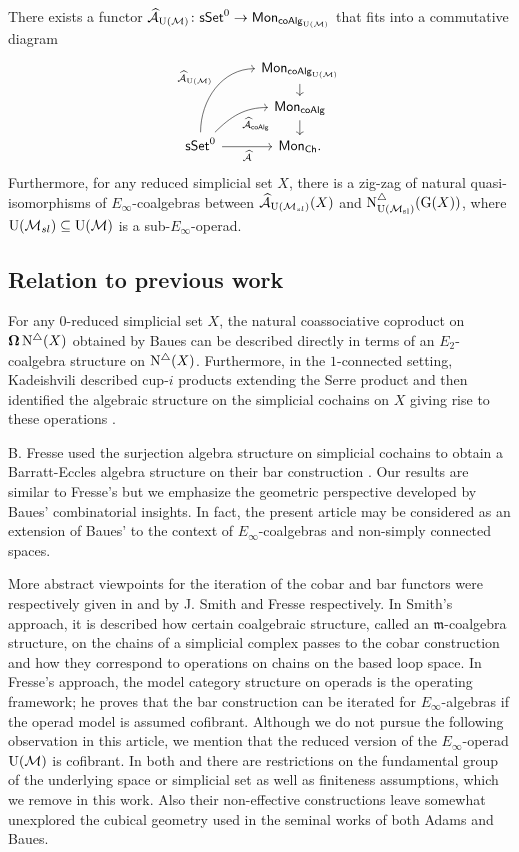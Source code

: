 \begin{theorem} \label{t:2nd main thm in the intro} There exists a functor $\operatorname{\mathcal{\widehat{A}}}_{\operatorname{U}(\mathcal{M})} \colon \mathsf{sSet}^0 \to \mathsf{Mon}_{\mathsf{coAlg}_{\operatorname{U}(\mathcal{M})}}$ that fits into a commutative diagram
	\[
	\begin{tikzcd}[row sep=small]
	& \Mon_{\coAlg_\UM} \arrow[d] \\
	& \Mon_{\coAlg} \arrow[d] \\
	\sSet^0
	\arrow[r, "\Ahat"', ]
	\arrow[ru, "\Ahat_{\coAlg}"', out=45, in=180] 
	\arrow[ruu, "\Ahat_\UM", out=90, in=180]
	& \Mon_{\Ch}.
	\end{tikzcd}
	\]
	Furthermore, for any reduced simplicial set $X$, there is a zig-zag of natural quasi-isomorphisms of $E_{\infty}$-coalgebras between $\operatorname{\mathcal{\widehat{A}}}_{\operatorname{U}(\mathcal{M}_{sl})}(X)$ and $\operatorname{N^{\triangle}_{{\operatorname{U}(\mathcal{M}_{sl})}}}(\operatorname{G}(X))$, where ${\operatorname{U}(\mathcal{M}_{sl})} \subseteq {\operatorname{U}(\mathcal{M})}$ is a sub-$E_\infty$-operad.
\end{theorem}

\subsection*{Relation to previous work}

For any $0$-reduced simplicial set $X$, the natural coassociative coproduct on $\operatorname{\mathbf{\Omega}} \operatorname{N^{\triangle}}(X)$ obtained by Baues can be described directly in terms of an $E_2$-coalgebra structure on $\operatorname{N^{\triangle}}(X)$.
Furthermore, in the $1$-connected setting, Kadeishvili described cup-$i$ products extending the Serre product and then identified the algebraic structure on the simplicial cochains on $X$ giving rise to these operations \cite{kadeishvili1999coproducts, kadeishvili2003cup-i}.

B. Fresse used the surjection algebra structure on simplicial cochains to obtain a Barratt-Eccles algebra structure on their bar construction \cite{fresse2003hopf}.
Our results are similar to Fresse's but we emphasize the geometric perspective developed by Baues' combinatorial insights.
In fact, the present article may be considered as an extension of Baues' \cite{baues1998hopf} to the context of $E_{\infty}$-coalgebras and non-simply connected spaces.

More abstract viewpoints for the iteration of the cobar and bar functors were respectively given in \cite{smith1994cobar} and \cite{fresse2010props} by J. Smith and Fresse respectively.
In Smith's approach, it is described how certain coalgebraic structure, called an $\mathfrak{m}$-coalgebra structure, on the chains of a simplicial complex passes to the cobar construction and how they correspond to operations on chains on the based loop space.
In Fresse's approach, the model category structure on operads is the operating framework; he proves that the bar construction can be iterated for $E_{\infty}$-algebras if the operad model is assumed cofibrant.
Although we do not pursue the following observation in this article, we mention that the reduced version of the $E_{\infty}$-operad ${\operatorname{U}(\mathcal{M})}$ is cofibrant.
In both \cite{fresse2010bar} and \cite{smith1994cobar} there are restrictions on the fundamental group of the underlying space or simplicial set as well as finiteness assumptions, which we remove in this work.
Also their non-effective constructions leave somewhat unexplored the cubical geometry used in the seminal works of both Adams and Baues.

